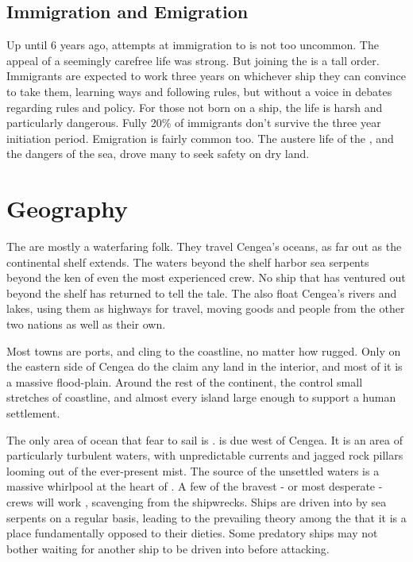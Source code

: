 \documentclass[blue]{GL2020}
\begin{document}
\subsection*{Immigration and Emigration}
Up until 6 years ago, attempts at immigration to \pShip{} is not too uncommon. The appeal of a seemingly carefree life was strong. But joining the \pShippies{} is a tall order. Immigrants are expected to work three years on whichever ship they can convince to take them, learning \pShip{} ways and  following \pShip{} rules, but without a voice in debates regarding rules and policy. For those not born on a ship, the life is harsh and particularly dangerous. Fully 20\% of immigrants don't survive the three year initiation period. Emigration is fairly common too. The austere life of the \pShip{}, and the dangers of the sea, drove many to seek safety on dry land.

\section*{Geography}
The \pShip{} are mostly a waterfaring folk. They travel Cengea's oceans, as far out as the continental shelf extends. The waters beyond the shelf harbor sea serpents beyond the ken of even the most experienced \pShippies{} crew. No ship that has ventured out beyond the shelf has returned to tell the tale. The \pShippies{} also float Cengea's rivers and lakes, using them as highways for travel, moving goods and people from the other two nations as well as their own.

Most \pShip{} towns are ports, and cling to the coastline, no matter how rugged. Only on the eastern side of Cengea do the \pShippies{} claim any land in the interior, and most of it is a massive flood-plain. Around the rest of the continent, the \pShip{} control small stretches of coastline, and almost every island large enough to support a human settlement. 

The only area of ocean that \pShippies{} fear to sail is \pWod{}. \pWod{} is due west of Cengea. It is an area of particularly turbulent waters, with unpredictable currents and jagged rock pillars looming out of the ever-present mist. The source of the unsettled waters is a massive whirlpool at the heart of \pWod{}. A few of the bravest - or most desperate - crews will work \pWod{}, scavenging from the shipwrecks. Ships are driven into \pWod{} by sea serpents on a regular basis, leading to the prevailing theory among the \pShippies{} that it is a place fundamentally opposed to their dieties. Some predatory ships may not bother waiting for another ship to be driven into \pWoD{} before attacking.
\end{document}
